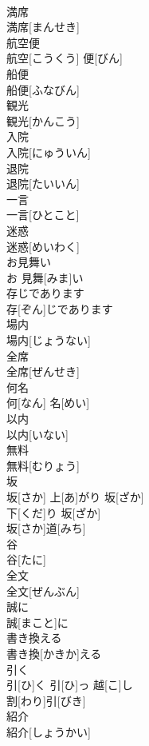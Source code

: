 \documentclass[8pt]{extreport}
\begin{document}
\begin{CJK}{UTF8}{min}
\\	満席	
\\	満席[まんせき]	
\\	航空便	
\\	航空[こうくう] 便[びん]	
\\	船便	
\\	船便[ふなびん]	
\\	観光	
\\	観光[かんこう]	
\\	入院	
\\	入院[にゅういん]	
\\	退院	
\\	退院[たいいん]	
\\	一言	
\\	一言[ひとこと]	
\\	迷惑	
\\	迷惑[めいわく]	
\\	お見舞い	
\\	お 見舞[みま]い	
\\	存じであります	
\\	存[ぞん]じであります	
\\	場内	
\\	場内[じょうない]	
\\	全席	
\\	全席[ぜんせき]	
\\	何名	
\\	何[なん] 名[めい]	
\\	以内	
\\	以内[いない]	
\\	無料	
\\	無料[むりょう]	
\\	坂	
\\	坂[さか]	上[あ]がり 坂[ざか] 
\\	下[くだ]り 坂[ざか] 
\\	坂[さか]道[みち] 
\\	谷	
\\	谷[たに]	
\\	全文	
\\	全文[ぜんぶん]	
\\	誠に	
\\	誠[まこと]に	
\\	書き換える	
\\	書き換[かきか]える	
\\	引く	
\\	引[ひ]く	引[ひ]っ 越[こ]し 
\\	割[わり]引[びき] 
\\	紹介	
\\	紹介[しょうかい]	

\end{CJK}
\end{document}
